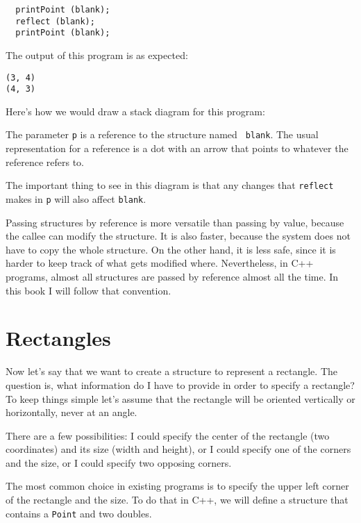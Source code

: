 \begin{verbatim}
  printPoint (blank);
  reflect (blank);
  printPoint (blank);
\end{verbatim}
%
The output of this program is as expected:

\begin{verbatim}
(3, 4)
(4, 3)
\end{verbatim}
%
Here's how we would draw a stack diagram for this program:

\vspace{0.1in}
\centerline{}
\vspace{0.1in}
%
The parameter {\tt p} is a reference to the structure named {\tt
blank}.  The usual representation for a reference is a dot with an
arrow that points to whatever the reference refers to.

The important thing to see in this diagram is that any changes that
{\tt reflect} makes in {\tt p} will also affect {\tt blank}.

Passing structures by reference is more versatile than passing by
value, because the callee can modify the structure.  It is also
faster, because the system does not have to copy the whole
structure.  On the other hand, it is less safe, since it is harder to
keep track of what gets modified where.  Nevertheless, in C++
programs, almost all structures are passed by reference almost all the
time.  In this book I will follow that convention.


\section{Rectangles}

Now let's say that we want to create a structure to represent
a rectangle.  The question is, what information do I have to
provide in order to specify a rectangle?  To keep things simple
let's assume that the rectangle will be oriented vertically or
horizontally, never at an angle.

There are a few possibilities: I could specify the center of
the rectangle (two coordinates) and its size (width and height),
or I could specify one of the corners and the size, or I
could specify two opposing corners.

The most common choice in existing programs is to specify the
upper left corner of the rectangle and the size.  To do that
in C++, we will define a structure that contains a {\tt Point}
and two doubles.


